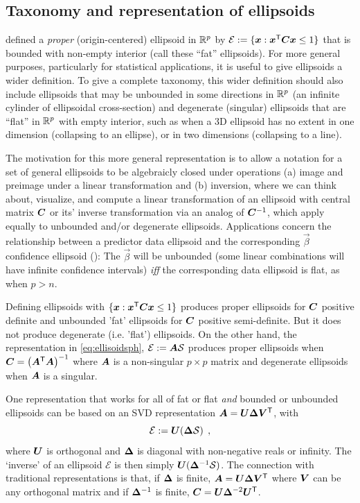 \subsection{Taxonomy and representation of ellipsoids}\label{sec:taxonomy}
 defined a \emph{proper} (origin-centered) ellipsoid in  $\mathbb{R}^{p}$ by
$\mathcal{E} := \{ \bm{x}: \bm{x}^\mathsf{T} \bm{C} \bm{x} \le 1 \}$ that is bounded with non-empty interior (call these ``fat'' ellipsoids).
For more general purposes, particularly for statistical applications,
it is useful to give ellipsoids a wider definition.
To give a complete taxonomy, this wider definition should also include ellipsoids that may be unbounded in some directions in $\mathbb{R}^{p}$
(an infinite cylinder of ellipsoidal cross-section) and
degenerate (singular) ellipsoids that are ``flat'' in  $\mathbb{R}^{p}$ with empty interior, such as when a 3D ellipsoid has no extent in
one dimension (collapsing to an ellipse), or in two dimensions (collapsing to a line).

The motivation for this more general representation is to allow a notation for a set of general ellipsoids to be
algebraicly closed under operations (a) image and preimage under a linear transformation and (b) inversion,
where we can think about, visualize, and compute a linear transformation of an ellipsoid with central matrix
$\bm{C}$ or its' inverse transformation via an analog of $\bm{C}^{-1}$, which apply equally to unbounded
and/or degenerate ellipsoids. Applications concern the relationship between a predictor data ellipsoid and the
corresponding $\vec{\beta}$ confidence ellipsoid (): The $\vec{\beta}$ will be unbounded (some linear combinations
will have infinite confidence intervals) \emph{iff} the corresponding data ellipsoid is flat, as when $p>n$.

Defining ellipsoids with $\{ \bm{x}: \bm{x}^\mathsf{T} \bm{C} \bm{x} \le 1 \}$ produces proper ellipsoids for $\bm{C}$
positive definite and unbounded 'fat' ellipsoids for $\bm{C}$ positive semi-definite.
But it does not produce degenerate (i.e. 'flat') ellipsoids.  On the other hand,
the representation in \eqref{eq:ellisoidsph},
$\mathcal{E} := \bm{A} \mathcal{S}$ produces proper ellipsoids when $\bm{C} = \left( \bm{A} ^\mathsf{T} \bm{A} \right)^{-1}$
where $\bm{A}$ is a non-singular $p \times p$ matrix and degenerate ellipsoids when $\bm{A}$ is a singular.

One representation that works for all of fat or flat \emph{and} bounded or unbounded ellipsoids can be based on an SVD representation
$\bm{A}  = \bm{U} \bm{\Delta} \bm{V}^\mathsf{T}$, with
\begin{equation}
 \mathcal{E} := \bm{U} (\bm{\Delta} \mathcal{S}) \:\: ,
\end{equation}
where $\bm{U}$ is orthogonal and $\bm{\Delta}$ is diagonal with non-negative reals or infinity.
The `inverse' of an ellipsoid $\mathcal{E}$ is then simply $\bm{U} (\bm{\Delta}^{-1} \mathcal{S})$.
The connection with traditional representations is that,
if $\bm{\Delta}$ is finite,
$\bm{A}  = \bm{U} \bm{\Delta} \bm{V}^\mathsf{T}$
where $\bm{V}$ can be any orthogonal matrix and
if $\bm{\Delta}^{-1}$ is finite, $\bm{C} = \bm{U} \bm{\Delta}^{-2} \bm{U}^\mathsf{T}$.

